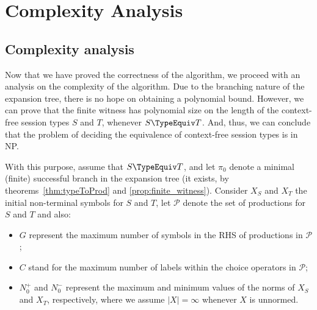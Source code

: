 \section{Complexity Analysis}
\label{sec:complexity}


\subsection{Complexity analysis}

Now that we have proved the correctness of the algorithm,
we proceed with an analysis on the complexity of the algorithm.
Due to the branching nature of the expansion tree, 
there is no hope on obtaining a polynomial bound.
However, we can prove that the finite witness has polynomial size on the 
length of the context-free session types $S$ and $T$, whenever
$S\TypeEquiv T$. 
And, thus, we can conclude that the problem of deciding the equivalence 
of context-free session types is in \textsf{NP}.

With this purpose, assume that $S\TypeEquiv T$, and let $\pi_0$
denote a minimal (finite) successful branch in the expansion tree
(it exists, by theorems~\ref{thm:typeToProd} and \ref{prop:finite_witness}).
Consider $X_S$ and $X_T$ the initial non-terminal symbols for 
$S$ and $T$, let $\mathcal{P}$ denote the set of productions for 
$S$ and $T$ and also:
\begin{itemize}
	\item $G$ represent the maximum number of symbols in the RHS
	      of productions in $\mathcal{P}$;
	\item $C$ stand for the maximum number of labels within the choice 
		  operators in $\mathcal{P}$;
	\item $N_0^+$ and $N_0^-$ represent the maximum and minimum values
		  of the norms of $X_S$ and $X_T$, respectively, where we 
		  assume $|X|=\infty$ whenever $X$ is unnormed.
\end{itemize}

